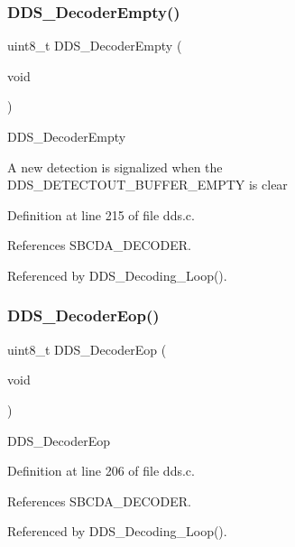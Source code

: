 \subsubsection{\texorpdfstring{D\+D\+S\+\_\+\+Decoder\+Empty()}{DDS\_DecoderEmpty()}}
{\footnotesize\ttfamily uint8\+\_\+t D\+D\+S\+\_\+\+Decoder\+Empty (\begin{DoxyParamCaption}\item[{void}]{ }\end{DoxyParamCaption})}

D\+D\+S\+\_\+\+Decoder\+Empty

A new detection is signalized when the D\+D\+S\+\_\+\+D\+E\+T\+E\+C\+T\+O\+U\+T\+\_\+\+B\+U\+F\+F\+E\+R\+\_\+\+E\+M\+P\+TY is clear 

Definition at line 215 of file dds.\+c.



References S\+B\+C\+D\+A\+\_\+\+D\+E\+C\+O\+D\+ER.



Referenced by D\+D\+S\+\_\+\+Decoding\+\_\+\+Loop().

\mbox{\label{group___d_d_s___a_p_i_gadf4e994e9b2e845a52a72fcc5af9f19b}} 
\subsubsection{\texorpdfstring{D\+D\+S\+\_\+\+Decoder\+Eop()}{DDS\_DecoderEop()}}
{\footnotesize\ttfamily uint8\+\_\+t D\+D\+S\+\_\+\+Decoder\+Eop (\begin{DoxyParamCaption}\item[{void}]{ }\end{DoxyParamCaption})}

D\+D\+S\+\_\+\+Decoder\+Eop 

Definition at line 206 of file dds.\+c.



References S\+B\+C\+D\+A\+\_\+\+D\+E\+C\+O\+D\+ER.



Referenced by D\+D\+S\+\_\+\+Decoding\+\_\+\+Loop().

\mbox{\label{group___d_d_s___a_p_i_gae4f18ac70ccacf5b0c08f35df3a68c7e}} 
